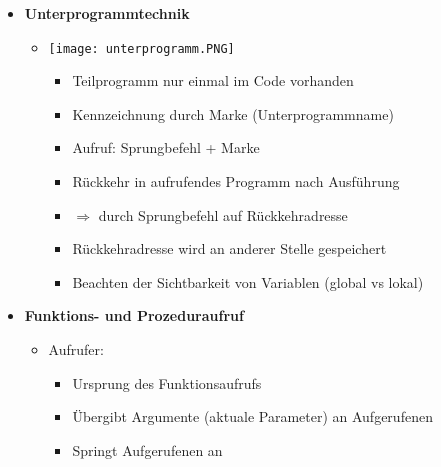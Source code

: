 \begin{itemize}
        \item \textbf{Unterprogrammtechnik}
            \begin{itemize}
                \item[]
                    \begin{minipage}{0.25\textwidth}
                        \texttt{[image: unterprogramm.PNG]}
                    \end{minipage}
                    \begin{minipage}{0.65\textwidth}
                        \begin{itemize}
                            \item Teilprogramm nur einmal im Code vorhanden
                            \item Kennzeichnung durch Marke (Unterprogrammname)
                            \item Aufruf: Sprungbefehl + Marke 
                            \item Rückkehr in aufrufendes Programm nach Ausführung
                            \item[] $\Rightarrow$ durch Sprungbefehl auf Rückkehradresse
                            \item Rückkehradresse wird an anderer Stelle gespeichert
                            \item Beachten der Sichtbarkeit von Variablen (global vs lokal)
                        \end{itemize}
                    \end{minipage}
            \end{itemize}

        \item \textbf{Funktions- und Prozeduraufruf}
            \begin{itemize}
                \item Aufrufer:
                    \begin{itemize}
                        \item Ursprung des Funktionsaufrufs
                        \item Übergibt Argumente (aktuale Parameter) an Aufgerufenen
                        \item Springt Aufgerufenen an
                    \end{itemize}


\end{itemize}
\end{itemize}
